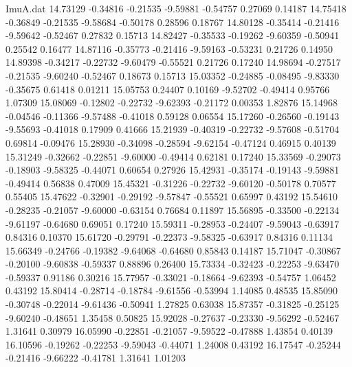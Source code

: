 \begin{filecontents}{ImuA.dat}
  14.73129   -0.34816   -0.21535   -9.59881   -0.54757    0.27069    0.14187
  14.75418   -0.36849   -0.21535   -9.58684   -0.50178    0.28596    0.18767
  14.80128   -0.35414   -0.21416   -9.59642   -0.52467    0.27832    0.15713
  14.82427   -0.35533   -0.19262   -9.60359   -0.50941    0.25542    0.16477
  14.87116   -0.35773   -0.21416   -9.59163   -0.53231    0.21726    0.14950
  14.89398   -0.34217   -0.22732   -9.60479   -0.55521    0.21726    0.17240
  14.98694   -0.27517   -0.21535   -9.60240   -0.52467    0.18673    0.15713
  15.03352   -0.24885   -0.08495   -9.83330   -0.35675    0.61418    0.01211
  15.05753    0.24407    0.10169   -9.52702   -0.49414    0.95766    1.07309
  15.08069   -0.12802   -0.22732   -9.62393   -0.21172    0.00353    1.82876
  15.14968   -0.04546   -0.11366   -9.57488   -0.41018    0.59128    0.06554
  15.17260   -0.26560   -0.19143   -9.55693   -0.41018    0.17909    0.41666
  15.21939   -0.40319   -0.22732   -9.57608   -0.51704    0.69814   -0.09476
  15.28930   -0.34098   -0.28594   -9.62154   -0.47124    0.46915    0.40139
  15.31249   -0.32662   -0.22851   -9.60000   -0.49414    0.62181    0.17240
  15.33569   -0.29073   -0.18903   -9.58325   -0.44071    0.60654    0.27926
  15.42931   -0.35174   -0.19143   -9.59881   -0.49414    0.56838    0.47009
  15.45321   -0.31226   -0.22732   -9.60120   -0.50178    0.70577    0.55405
  15.47622   -0.32901   -0.29192   -9.57847   -0.55521    0.65997    0.43192
  15.54610   -0.28235   -0.21057   -9.60000   -0.63154    0.76684    0.11897
  15.56895   -0.33500   -0.22134   -9.61197   -0.64680    0.69051    0.17240
  15.59311   -0.28953   -0.24407   -9.59043   -0.63917    0.84316    0.10370
  15.61720   -0.29791   -0.22373   -9.58325   -0.63917    0.84316    0.11134
  15.66349   -0.24766   -0.19382   -9.64068   -0.64680    0.85843    0.14187
  15.71047   -0.30867   -0.20100   -9.60838   -0.59337    0.88896    0.26400
  15.73334   -0.32423   -0.22253   -9.63470   -0.59337    0.91186    0.30216
  15.77957   -0.33021   -0.18664   -9.62393   -0.54757    1.06452    0.43192
  15.80414   -0.28714   -0.18784   -9.61556   -0.53994    1.14085    0.48535
  15.85090   -0.30748   -0.22014   -9.61436   -0.50941    1.27825    0.63038
  15.87357   -0.31825   -0.25125   -9.60240   -0.48651    1.35458    0.50825
  15.92028   -0.27637   -0.23330   -9.56292   -0.52467    1.31641    0.30979
  16.05990   -0.22851   -0.21057   -9.59522   -0.47888    1.43854    0.40139
  16.10596   -0.19262   -0.22253   -9.59043   -0.44071    1.24008    0.43192
  16.17547   -0.25244   -0.21416   -9.66222   -0.41781    1.31641    1.01203

\end{filecontents}
